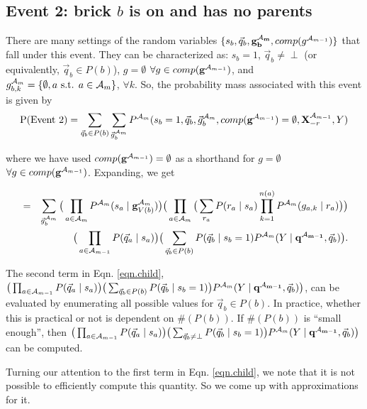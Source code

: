 \documentclass[11pt]{article}
\newcommand{\A}{{\cal A}}
\newcommand{\X}{\mathbf{X}}
\newcommand{\XrmPrev}{\X^{\A_{m-1}}_{-r}}
\newcommand{\Am}{\A_{m}}
\newcommand{\gcompPrev}{comp(\mathbf{g}^{\A_{m-1}})}
\newcommand{\qb}{\vec{q}_b}
\newcommand{\qa}{\vec{q}_a}
\begin{document}
\subsection*{Event 2: brick $b$ is on and has no parents}

There are many settings of the random variables $\{s_b, \qb, \mathbf{g^{\Am}_b}, comp(g^{\A_{m-1}})\}$ that fall under this event. They can be characterized as: $s_b=1$, $\qb \neq \perp$ (or equivalently, $\qb \in P(b)$), $g = \emptyset$ $\forall g \in \gcompPrev$, and $g^{\Am}_{b,k} = \{\emptyset, a \text{ s.t. } a \in {\Am}\}$, $\forall k$. So, the probability mass associated with this event is given by
\begin{eqnarray}
\text{P(Event 2)} = \sum_{\vec{q}_b \in P(b)} \sum_{\vec{g}^{\Am}_{b}} P^{\Am}(s_b=1, \vec{q}_b, \vec{g}^{\Am}_{b}, \gcompPrev = \emptyset, \XrmPrev, Y)
\end{eqnarray}

where we have used $\gcompPrev = \emptyset$ as a shorthand for $g = \emptyset$ $\forall g \in \gcompPrev$. Expanding, we get

\begin{eqnarray}
&=& \sum_{\vec{g}^{\Am}_{b}} \big( \prod_{a \in {\Am}} P^{\Am}(s_a \mid \mathbf{g}^{\Am}_{V({b})}) \big ) \big( \prod_{a \in {\A_{m}}} \big( \sum_{r_a} P(r_a \mid s_a) \prod_{k=1}^{n(a)} P^{\Am}(g_{a,k} \mid r_a) \big) \big) \label{eqn.child} \\
%
& & \big( \prod_{a \in {\A_{m-1}}} P(\qa \mid s_a)\big) \big( \sum_{\vec{q}_b \in P(b)} P(\qb \mid s_b = 1) P^{\Am}(Y \mid \mathbf{q^{\A_{m-1}}}, \vec{q}_b) \big). \nonumber
\end{eqnarray}

The second term in Eqn. \ref{eqn.child}, $\big( \prod_{a \in {\A_{m-1}}} P(\qa \mid s_a)\big) \big( \sum_{\vec{q}_b \in P(b)} P(\qb \mid s_b = 1)\big) P^{\Am}(Y \mid \mathbf{q^{\A_{m-1}}}, \vec{q}_b) \big)$, can be evaluated by enumerating all possible values for $\vec{q}_b \in P(b)$. In practice, whether this is practical or not is dependent on $\#(P(b))$. If $\#(P(b))$ is ``small enough'', then $\big( \prod_{a \in {\A_{m-1}}} P(\qa \mid s_a)\big) \big( \sum_{\vec{q}_b \neq \perp} P(\qb \mid s_b = 1)\big) P^{\Am}(Y \mid \mathbf{q^{\A_{m-1}}}, \vec{q}_b) \big)$ can be computed. 

Turning our attention to the first term in Eqn. \ref{eqn.child}, we note that it is not possible to efficiently compute this quantity. So we come up with approximations for it.
\end{document}

